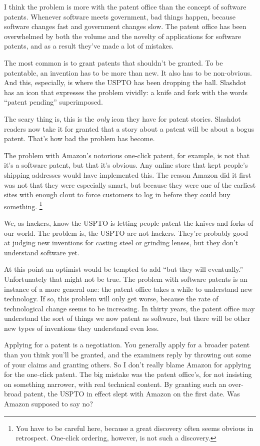 I think the problem is more with the patent office than the concept of
software patents. Whenever software meets government, bad things happen,
because software changes fast and government changes slow. The patent
office has been overwhelmed by both the volume and the novelty of
applications for software patents, and as a result they've made a lot of
mistakes.

The most common is to grant patents that shouldn't be granted. To be
patentable, an invention has to be more than new. It also has to be
non-obvious. And this, especially, is where the USPTO has been dropping
the ball. Slashdot has an icon that expresses the problem vividly: a
knife and fork with the words ``patent pending'' superimposed.

The scary thing is, this is the \emph{only} icon they have for patent
stories. Slashdot readers now take it for granted that a story about a
patent will be about a bogus patent. That's how bad the problem has
become.

The problem with Amazon's notorious one-click patent, for example, is
not that it's a software patent, but that it's obvious. Any online store
that kept people's shipping addresses would have implemented this. The
reason Amazon did it first was not that they were especially smart, but
because they were one of the earliest sites with enough clout to force
customers to log in before they could buy something.
\footnote{You have to be careful here, because a great discovery often
seems obvious in retrospect. One-click ordering, however, is not such a
discovery.}

We, as hackers, know the USPTO is letting people patent the knives and
forks of our world. The problem is, the USPTO are not hackers. They're
probably good at judging new inventions for casting steel or grinding
lenses, but they don't understand software yet.

At this point an optimist would be tempted to add ``but they will
eventually.'' Unfortunately that might not be true. The problem with
software patents is an instance of a more general one: the patent office
takes a while to understand new technology. If so, this problem will
only get worse, because the rate of technological change seems to be
increasing. In thirty years, the patent office may understand the sort
of things we now patent as software, but there will be other new types
of inventions they understand even less.

Applying for a patent is a negotiation. You generally apply for a
broader patent than you think you'll be granted, and the examiners reply
by throwing out some of your claims and granting others. So I don't
really blame Amazon for applying for the one-click patent. The big
mistake was the patent office's, for not insisting on something
narrower, with real technical content. By granting such an over-broad
patent, the USPTO in effect slept with Amazon on the first date. Was
Amazon supposed to say no?

